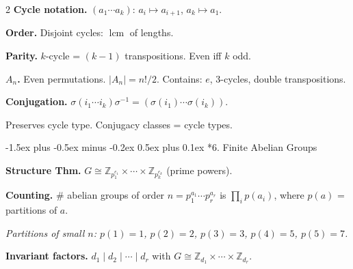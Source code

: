 \documentclass[8pt,a4paper]{extarticle}
\makeatletter
\newcommand{\Z}{\mathbb{Z}}
\newcommand{\lcm}{\operatorname{lcm}}
\renewcommand\subsection{\@startsection{subsection}{2}{\z@}%
  {-1.5ex plus -0.5ex minus -0.2ex}%
  {0.5ex plus 0.1ex}%
  {\normalfont\normalsize\bfseries}}
\makeatother
\begin{document}
\begin{multicols}{2}
\textbf{Cycle notation.} $(a_1 \cdots a_k)$: $a_i \mapsto a_{i+1}$, $a_k \mapsto a_1$.

\textbf{Order.} Disjoint cycles: $\lcm$ of lengths.

\textbf{Parity.} $k$-cycle = $(k-1)$ transpositions. Even iff $k$ odd.

\textbf{$A_n$.} Even permutations. $|A_n| = n!/2$. Contains: $e$, 3-cycles, double transpositions.

\textbf{Conjugation.} $\sigma(i_1 \cdots i_k)\sigma^{-1} = (\sigma(i_1) \cdots \sigma(i_k))$.

Preserves cycle type. Conjugacy classes = cycle types.

\vspace{4pt}
\vspace{4pt}

\subsection*{6. Finite Abelian Groups}

\textbf{Structure Thm.} $G \cong \Z_{p_1^{e_1}} \times \cdots \times \Z_{p_k^{e_k}}$ (prime powers).

\textbf{Counting.} \# abelian groups of order $n = p_1^{a_1} \cdots p_r^{a_r}$ is $\prod_i p(a_i)$, where $p(a)$ = partitions of $a$.

\textit{Partitions of small $n$: $p(1)=1$, $p(2)=2$, $p(3)=3$, $p(4)=5$, $p(5)=7$.}

\textbf{Invariant factors.} $d_1 \mid d_2 \mid \cdots \mid d_r$ with $G \cong \Z_{d_1} \times \cdots \times \Z_{d_r}$.

\vspace{4pt}
\vspace{4pt}


\end{multicols}
\end{document}
